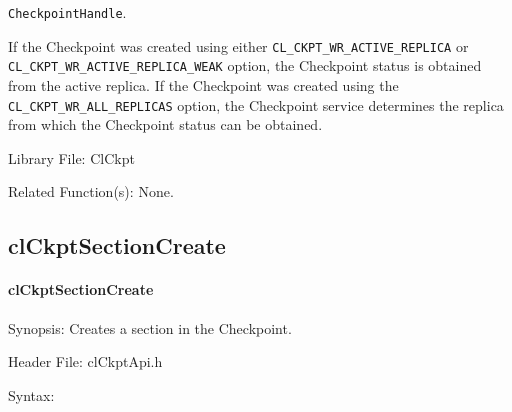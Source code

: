 \begin{flushleft}
\begin{Desc}
{\tt{Checkpoint\-Handle}}. 
 \par
 If the Checkpoint was created using either {\tt{CL\_\-CKPT\_\-WR\_\-ACTIVE\_\-REPLICA}} or {\tt{CL\_\-CKPT\_\-WR\_\-ACTIVE\_\-REPLICA\_\-WEAK}} option, 
 the Checkpoint status is obtained from the active replica. If the Checkpoint was created using the {\tt{CL\_\-CKPT\_\-WR\_\-ALL\_\-REPLICAS}} option, the
 Checkpoint service determines the replica from which the Checkpoint status can be obtained.\end{Desc}
\begin{Desc}
\item[Library File:]Cl\-Ckpt\end{Desc}
\begin{Desc}
\item[Related Function(s):]None. \end{Desc}
\newpage



\subsection{clCkptSectionCreate}
\hypertarget{pageckpt110}{}\paragraph{cl\-Ckpt\-Section\-Create}\label{pageckpt110}
\begin{Desc}
\item[Synopsis:]Creates a section in the Checkpoint.\end{Desc}
\begin{Desc}
\item[Header File:]clCkptApi.h\end{Desc}
\begin{Desc}
\item[Syntax:]


\end{Desc}
\end{flushleft}
